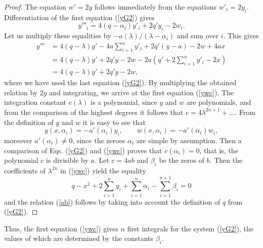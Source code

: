 \documentclass[11pt]{article}
\theoremstyle{plain}
\theoremstyle{definition}
\begin{document}
\begin{proof}
The equation $w'=2y$ follows immediately from the equations $w'_i=2y_i$. Differentiation of the first equation (\ref{yG2}) gives
\[
 y'''_i=4(q-\alpha_i)y'_i+2q'y_i-2w_i.
\]
Let us multiply these equalities by $-a(\lambda)/(\lambda-\alpha_i)$ and sum over $i$. This gives
\begin{align*}
 y''' &= 4(q-\lambda)y' -4a\sum^n_{i=1}y'_i +2q'(y-a)-2w+4ax\\
  &= 4(q-\lambda)y'+2q'y-2w - 2a\left(q'+2\sum^n_{i=1}y'_i-2x\right)\\
  &= 4(q-\lambda)y'+2q'y-2w,
\end{align*}
where we have used the last equation (\ref{yG2}). By multiplying the obtained relation by $2y$ and integrating, we arrive at the first equation (\ref{ywc}). The integration constant $c(\lambda)$ is a polynomial, since $y$ and $w$ are polynomials, and from the comparison of the highest degrees it follows that $c=4\lambda^{2n+1}+\dotso$. From the definition of $y$ and $w$ it is easy to see that
\[
 y(x,\alpha_i)=-a'(\alpha_i)y_i,\qquad w(x,\alpha_i)=-a'(\alpha_i)w_i,
\]
moreover $a'(\alpha_i)\ne0$, since the zeroes $\alpha_i$ are simple by assumption. Then a comparison of Eqs. (\ref{yG2}) and (\ref{ywc}) proves that $c(\alpha_i)=0$, that is, the polynomial $c$ is divisible by $a$. Let $c=4ab$ and $\beta_i$ be the zeros of $b$. Then the coefficients of $\lambda^{2n}$ in (\ref{ywc}) yield the equality
\[
 q-x^2+2\sum^n_{i=1}y_i+\sum^n_{i=1}\alpha_i-\sum^{n+1}_{i=1}\beta_i=0
\]
and the relation (\ref{ab}) follows by taking into account the definition of $q$ from (\ref{yG2}).
\end{proof}

Thus, the first equation (\ref{ywc}) gives $n$ first integrals for the system (\ref{yG2}), the values of which are determined by the constants $\beta_i$.
\end{document}
